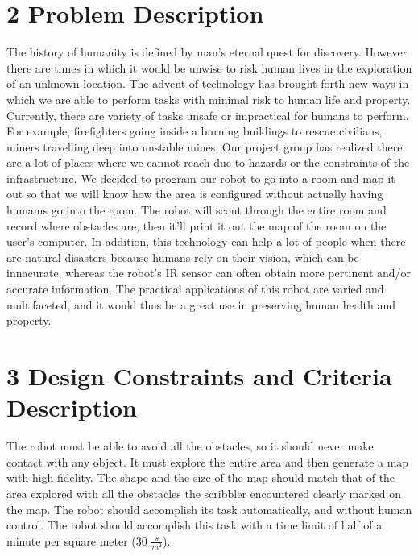 \documentclass[12pt]{article}
\begin{document}
\newpage

\section*{\fontsize{16}{16}\textsf{2 Problem Description}}
\onehalfspacing

The history of humanity is defined by man's eternal quest for discovery. However there are times in which it would be unwise to risk human lives in the exploration of an unknown location. The advent of technology has brought forth new ways in which we are able to perform tasks with minimal risk to human life and property.\\

Currently, there are variety of tasks unsafe or impractical for humans to perform. For example, firefighters going inside a burning buildings to rescue civilians, miners travelling deep into unstable mines. Our project group has realized there are a lot of places where we cannot reach due to hazards or the constraints of the infrastructure. We decided to program our robot to go into a room and map it out so that we will know how the area is configured without actually having humams go into the room. The robot will scout through the entire room and record where obstacles are, then it'll print it out the map of the room on the user's computer. In addition, this technology can help a lot of people when there are natural disasters because humans rely on their vision, which can be innacurate, whereas the robot's IR sensor can often obtain more pertinent and/or accurate information. The practical applications of this robot are varied and multifaceted, and it would thus be a great use in preserving human health and property.\\

\newpage

\section*{\fontsize{16}{16}\textsf{3 Design Constraints and Criteria Description}}
\onehalfspacing

The robot must be able to avoid all the obstacles, so it should never make contact with any object. It must explore the entire area and then generate a map with high fidelity. The shape and the size of the map should match that of the area explored with all the obstacles the scribbler encountered clearly marked on the map. The robot should accomplish its task automatically, and without human control. The robot should accomplish this task with a time limit of half of a minute per square meter (30 $\frac{s}{m^2}$).
\end{document}
